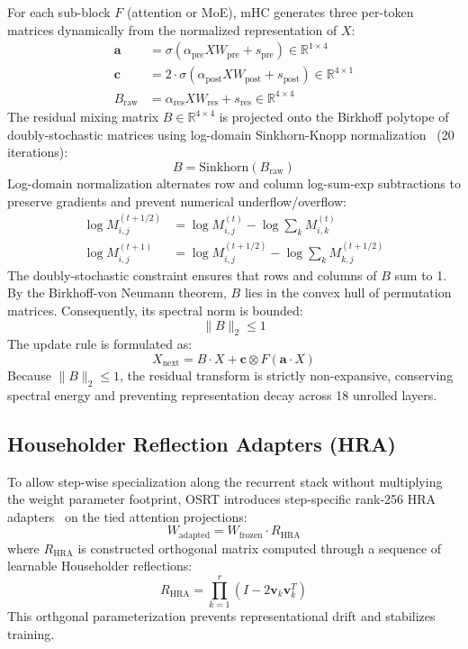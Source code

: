 \documentclass[11pt,twocolumn]{article}
\begin{document}
For each sub-block $F$ (attention or MoE), mHC generates three per-token matrices dynamically from the normalized representation of $X$:
\begin{align}
\mathbf{a} &= \sigma(\alpha_{\text{pre}} X W_{\text{pre}} + s_{\text{pre}}) \in \mathbb{R}^{1 \times 4} \\
\mathbf{c} &= 2 \cdot \sigma(\alpha_{\text{post}} X W_{\text{post}} + s_{\text{post}}) \in \mathbb{R}^{4 \times 1} \\
B_{\text{raw}} &= \alpha_{\text{res}} X W_{\text{res}} + s_{\text{res}} \in \mathbb{R}^{4 \times 4}
\end{align}
The residual mixing matrix $B \in \mathbb{R}^{4 \times 4}$ is projected onto the Birkhoff polytope of doubly-stochastic matrices using log-domain Sinkhorn-Knopp normalization~\cite{sinkhorn1967,cuturi2013} (20 iterations):
\begin{equation}
B = \text{Sinkhorn}(B_{\text{raw}})
\end{equation}
Log-domain normalization alternates row and column log-sum-exp subtractions to preserve gradients and prevent numerical underflow/overflow:
\begin{align}
\log M^{(t+1/2)}_{i, j} &= \log M^{(t)}_{i, j} - \log\sum_{k} M^{(t)}_{i, k} \\
\log M^{(t+1)}_{i, j} &= \log M^{(t+1/2)}_{i, j} - \log\sum_{k} M^{(t+1/2)}_{k, j}
\end{align}
The doubly-stochastic constraint ensures that rows and columns of $B$ sum to 1. By the Birkhoff-von Neumann theorem, $B$ lies in the convex hull of permutation matrices. Consequently, its spectral norm is bounded:
\begin{equation}
\|B\|_2 \le 1
\end{equation}
The update rule is formulated as:
\begin{equation}
X_{\text{next}} = B \cdot X + \mathbf{c} \otimes F(\mathbf{a} \cdot X)
\end{equation}
Because $\|B\|_2 \le 1$, the residual transform is strictly non-expansive, conserving spectral energy and preventing representation decay across 18 unrolled layers.

\subsection{Householder Reflection Adapters (HRA)}
To allow step-wise specialization along the recurrent stack without multiplying the weight parameter footprint, OSRT introduces step-specific rank-256 HRA adapters~\cite{hra2024,yuan2024} on the tied attention projections:
\begin{equation}
W_{\text{adapted}} = W_{\text{frozen}} \cdot R_{\text{HRA}}
\end{equation}
where $R_{\text{HRA}}$ is constructed orthogonal matrix computed through a sequence of learnable Householder reflections:
\begin{equation}
R_{\text{HRA}} = \prod_{k=1}^r \left(I - 2 \mathbf{v}_k \mathbf{v}_k^T\right)
\end{equation}
This orthgonal parameterization prevents representational drift and stabilizes training.
\end{document}
